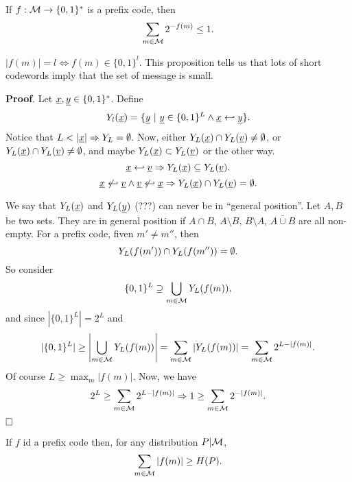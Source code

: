 \begin{prop}
	If $f:\mathcal{M} \rightarrow \{0, 1\}^*$ is a prefix code, then $$\sum_{m\in\mathcal{M}}2^{-f(m)}\leq 1.$$
\end{prop}

$|f(m)| = l \Leftrightarrow f(m) \in \{0, 1\}^l$. This proposition tells us that lots of short codewords imply that the set of message is small.

\noindent\textbf{Proof}. Let $\underline{x}, \underline{y} \in \{0, 1\}^*$. Define
$$Y_l(\underline{x}) = \{\underline{y}\ |\ \underline{y} \in \{0, 1\}^L \wedge \underline{x} \hookleftarrow \underline{y} \}.$$
Notice that $L < |\underline{x}| \Rightarrow Y_L = \emptyset.$ Now, either $Y_L(\underline{x}) \cap Y_L(\underline{v}) \not= \emptyset$, or $Y_L(\underline{x}) \cap Y_L(\underline{v}) \not= \emptyset$, and maybe $Y_L(\underline{x}) \subset Y_L(\underline{v})$ or the other way. 
$$\underline{x} \hookleftarrow \underline{v} \Rightarrow Y_L(\underline{x}) \subseteq Y_L(\underline{v}).$$
$$\underline{x} \not\hookleftarrow \underline{v} \wedge \underline{v} \not\hookleftarrow \underline{x} \Rightarrow Y_L(\underline{x}) \cap Y_L(\underline{v}) = \emptyset.$$

We say that $Y_L(\underline{x})$ and $Y_L(\underline{y})$ (???) can never be in ``general position''. Let $A, B$ be two sets. They are in general position if $A\cap B$, $A \setminus B$, $B \setminus A$, $\overline{A\cup B}$ are all non-empty. For a prefix code, fiven $m'\not= m''$, then $$Y_L(f(m')) \cap Y_L(f(m'')) = \emptyset.$$ So consider $$\{0, 1\}^L \supseteq \bigcup_{m \in\mathcal{M}}Y_L(f(m)),$$ and since $|\{0, 1\}^L| = 2^L$ and $$|\{0, 1\}^L| \geq \left|\bigcup_{m\in\mathcal{M}}Y_L(f(m))\right| = \sum_{m\in\mathcal{M}} |Y_L(f(m))| = \sum_{m \in \mathcal{M}} 2^{L - |f(m)|}.$$ Of course $L \geq \max_m |f(m)|$. Now, we have
$$2^L \geq \sum_{m\in\mathcal{M}}2^{L - |f(m)|} \Rightarrow 1 \geq \sum_{m\in\mathcal{M}} 2^{-|f(m)|}.$$
$\hfill\Box$

\begin{prop}
	If $f$ id a prefix code then, for any distribution $P|\mathcal{M}$, $$\sum_{m\in\mathcal{M}}|f(m)| \geq H(P).$$
\end{prop}